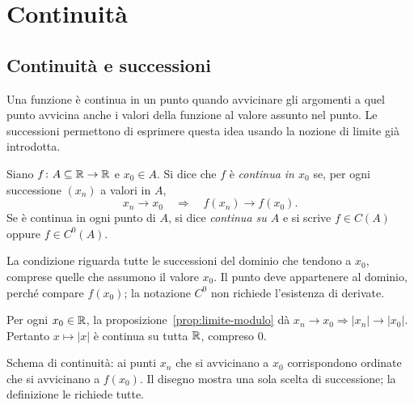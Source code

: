 \chapter{Continuità}
\label{cap:continuita}

\section{Continuità e successioni}

Una funzione è continua in un punto quando avvicinare gli argomenti a quel punto avvicina anche i valori della funzione al valore assunto nel punto. Le successioni permettono di esprimere questa idea usando la nozione di limite già introdotta.

\begin{definizione}
\label{def:continuita-sequenziale}
Siano $f\colon A\subseteq\mathbb{R}\to\mathbb{R}$ e $x_0\in A$. Si dice che $f$ è \emph{continua in $x_0$} se, per ogni successione $(x_n)$ a valori in $A$,
\[
x_n\longrightarrow x_0
\quad\Longrightarrow\quad
f(x_n)\longrightarrow f(x_0).
\]
Se è continua in ogni punto di $A$, si dice \emph{continua su $A$} e si scrive $f\in C(A)$ oppure $f\in C^0(A)$.
\end{definizione}

La condizione riguarda tutte le successioni del dominio che tendono a $x_0$, comprese quelle che assumono il valore $x_0$. Il punto deve appartenere al dominio, perché compare $f(x_0)$; la notazione $C^0$ non richiede l'esistenza di derivate.

\begin{esempio}
Per ogni $x_0\in\mathbb{R}$, la proposizione~\ref{prop:limite-modulo} dà $x_n\to x_0\Rightarrow|x_n|\to|x_0|$. Pertanto $x\mapsto|x|$ è continua su tutta $\mathbb{R}$, compreso $0$.
\end{esempio}

\begin{schema}
\par\smallskip Schema di continuità: ai punti $x_n$ che si avvicinano a $x_0$ corrispondono ordinate che si avvicinano a $f(x_0)$. Il disegno mostra una sola scelta di successione; la definizione le richiede tutte.
\end{schema}

